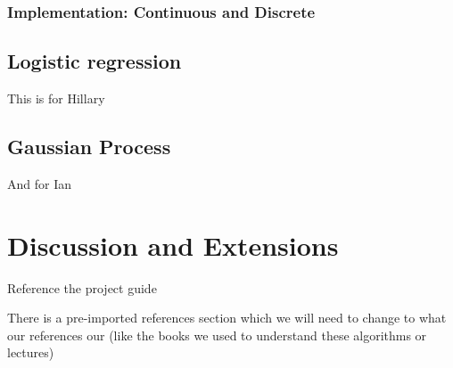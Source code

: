 \documentclass{article}
\begin{document}
\subsubsection{Implementation: Continuous and Discrete}



\subsection{Logistic regression}

This is for Hillary

\subsection{Gaussian Process}

And for Ian



\section{Discussion and Extensions}
Reference the project guide 









There is a pre-imported references section which we will need to change to what our references our (like the books we used to understand these algorithms or lectures)
\end{document}

